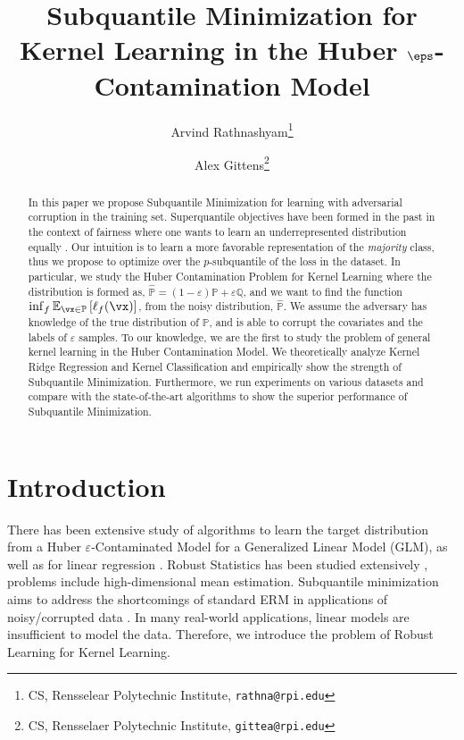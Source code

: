 \documentclass{article} %
\title{Subquantile Minimization for Kernel Learning in the Huber $\eps$-Contamination Model}
\author{Arvind Rathnashyam\thanks{CS, Rensselear Polytechnic Institute, \texttt{rathna@rpi.edu}} \and Alex Gittens\thanks{CS, Rensselaer Polytechnic Institute, \texttt{gittea@rpi.edu}}}
\theoremstyle{plain}
\theoremstyle{definition}
\theoremstyle{remark}
\begin{document}
	
	\maketitle
	
	\begin{abstract}
		\normalsize
		In this paper we propose Subquantile Minimization for learning with adversarial corruption in the training set. Superquantile objectives have been formed in the past in the context of fairness where one wants to learn an underrepresented distribution equally \cite{laguel:2021,rockafeller:2014}. Our intuition is to learn a more favorable representation of the {\em majority} class, thus we propose to optimize over the $p$-subquantile of the loss in the dataset. In particular, we study the Huber Contamination Problem for Kernel Learning where the distribution is formed as, $\hat{\mathbb{P}} = (1- \varepsilon)\mathbb{P} + \varepsilon \mathbb{Q}$, and we want to find the function $\inf_f \mathbb{E}_{\vx \in \mathbb{P}}\left[\ell_f(\vx)\right]$, from the noisy distribution, $\hat{\mathbb{P}}$. We assume the adversary has knowledge of the true distribution of $\mathbb{P}$, and is able to corrupt the covariates and the labels of $\varepsilon$ samples. To our knowledge, we are the first to study the problem of general kernel learning in the Huber Contamination Model. We theoretically analyze Kernel Ridge Regression and Kernel Classification and empirically show the strength of Subquantile Minimization. Furthermore, we run experiments on various datasets and compare with the state-of-the-art algorithms to show the superior performance of Subquantile Minimization. 
	\end{abstract}
	\clearpage
	
	\section{Introduction}
	There has been extensive study of algorithms to learn the target distribution from a Huber $\varepsilon$-Contaminated Model for a Generalized Linear Model (GLM), \citep{diakonikolas:2019,awasthi:2022,li:2021,osama:2020,fischler:1981} as well as for linear regression \cite{bhatia:2017,mukhoty:2019}. Robust Statistics has been studied extensively \cite{diakonikolas:2023}, problems include high-dimensional mean estimation.  Subquantile minimization aims to address the shortcomings of standard ERM in applications of noisy/corrupted data \citep{khetan:2018,jiang:2018}. In many real-world applications, linear models are insufficient to model the data. Therefore, we introduce the problem of Robust Learning for Kernel Learning. 
	
\end{document}
